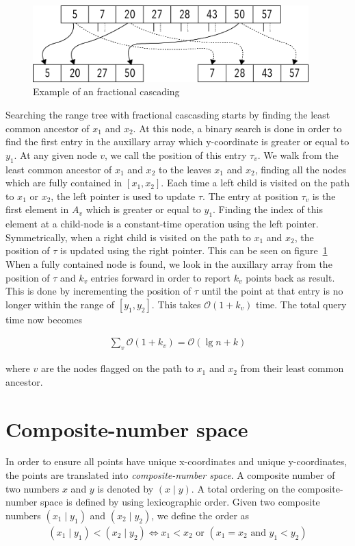 \begin{figure}[h]
    \centering
    \includegraphics[width = 0.95\textwidth]{pictures/fractional_cascading.png}
    \caption{Example of an fractional cascading}\label{fig:fractional}
\end{figure}


Searching the range tree with fractional cascasding starts by finding the least common ancestor of $x_1$ and $x_2$. At this node, a binary search is done in order to find the first entry in the auxillary array which y-coordinate is greater or equal to $y_1$. At any given node $v$, we call the position of this entry $\tau_v$. We walk from the least common ancestor of $x_1$ and $x_2$ to the leaves $x_1$ and $x_2$, finding all the nodes which are fully contained in $[x_1, x_2]$. Each time a left child is visited on the path to $x_1$ or $x_2$, the left pointer is used to update $\tau$. The entry at position $\tau_v$ is the first element in $A_v$ which is greater or equal to $y_1$. Finding the index of this element at a child-node is a constant-time operation using the left pointer. Symmetrically, when a right child is visited on the path to $x_1$ and $x_2$, the position of $\tau$ is updated using the right pointer. This can be seen on figure~\ref{fig:fractional} When a fully contained node is found, we look in the auxillary array from the position of $\tau$ and $k_v$ entries forward in order to report $k_v$ points back as result. This is done by incrementing the position of $\tau$ until the point at that entry is no longer within the range of $[y_1, y_2]$. This takes $\mathcal{O}(1+k_v)$ time. The total query time now becomes

\begin{align*}
  \sum\limits_{v} \mathcal{O}(1 + k_v) = \mathcal{O}(\lg n + k)
\end{align*}

\noindent where $v$ are the nodes flagged on the path to $x_1$ and $x_2$ from their least common ancestor.

\section{Composite-number space} 
\label{sect:composite}
In order to ensure all points have unique x-coordinates and unique y-coordinates, the points are translated into \emph{composite-number space}\cite{compgeo}. A composite number of two numbers $x$ and $y$ is denoted by $(x \mid y)$. A total ordering on the composite-number space is defined by using lexicographic order. Given two composite numbers $(x_1 \mid y_1)$ and $(x_2 \mid y_2)$, we define the order as
\begin{align*}
  (x_1 \mid y_1) < (x_2 \mid y_2) \iff x_1 < x_2 \text{ or } (x_1 = x_2 \text{ and } y_1 < y_2)
\end{align*}

